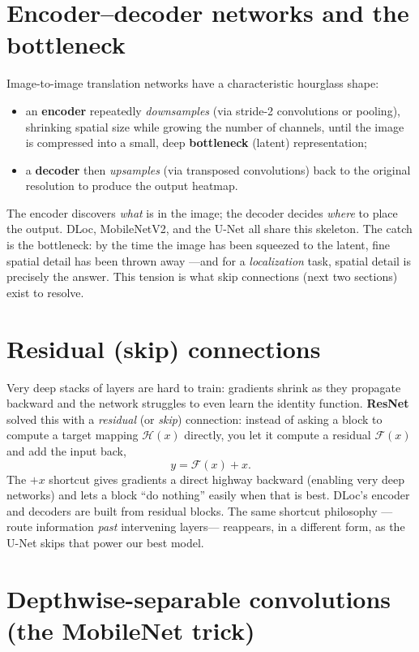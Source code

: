 \section{Encoder--decoder networks and the bottleneck}
\label{sec:blocks:encdec}

Image-to-image translation networks have a characteristic hourglass shape:
\begin{itemize}[leftmargin=1.4em,nosep]
  \item an \textbf{encoder} repeatedly \emph{downsamples} (via stride-2 convolutions or pooling),
  shrinking spatial size while growing the number of channels, until the image is compressed into a
  small, deep \textbf{bottleneck} (latent) representation;
  \item a \textbf{decoder} then \emph{upsamples} (via transposed convolutions) back to the original
  resolution to produce the output heatmap.
\end{itemize}
The encoder discovers \emph{what} is in the image; the decoder decides \emph{where} to place the
output. DLoc, MobileNetV2, and the U-Net all share this skeleton. The catch is the bottleneck: by the
time the image has been squeezed to the latent, fine spatial detail has been thrown away ---and for a
\emph{localization} task, spatial detail is precisely the answer. This tension is what skip
connections (next two sections) exist to resolve.

\section{Residual (skip) connections}
\label{sec:blocks:resnet}

Very deep stacks of layers are hard to train: gradients shrink as they propagate backward and the
network struggles to even learn the identity function. \textbf{ResNet} solved this with a
\emph{residual} (or \emph{skip}) connection: instead of asking a block to compute a target mapping
$\mathcal{H}(x)$ directly, you let it compute a residual $\mathcal{F}(x)$ and add the input back,
\[
  y = \mathcal{F}(x) + x .
\]
The $+x$ shortcut gives gradients a direct highway backward (enabling very deep networks) and lets a
block ``do nothing'' easily when that is best. DLoc's encoder and decoders are built from residual
blocks. The same shortcut philosophy ---route information \emph{past} intervening layers--- reappears,
in a different form, as the U-Net skips that power our best model.

\section{Depthwise-separable convolutions (the MobileNet trick)}
\label{sec:blocks:dwsep}

